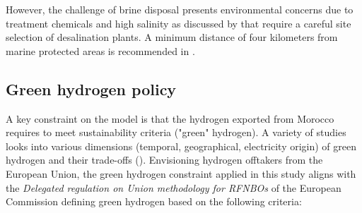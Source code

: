 However, the challenge of brine disposal presents environmental concerns due to treatment chemicals and high salinity as discussed by \cite{Thomann2022, Dresp2019, Tonelli2023} that require a careful site selection of desalination plants. A minimum distance of four kilometers from marine protected areas is recommended in \cite{Thomann2022}.


\subsection{Green hydrogen policy}
\label{subsec:green_hydrogen_constraint}

A key constraint on the model is that the hydrogen exported from Morocco requires to meet sustainability criteria ("green" hydrogen). A variety of studies looks into various dimensions (temporal, geographical, electricity origin) of green hydrogen and their trade-offs (\cite{Brauer2022, Ruhnau2022}). %
Envisioning hydrogen offtakers from the European Union, the green hydrogen constraint applied in this study aligns with the \emph{Delegated regulation on Union methodology for RFNBOs} of the European Commission \cite{Commission2023} defining green hydrogen  based on the following criteria:

